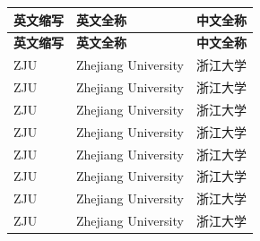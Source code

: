 \cleardoublepage
{}

\begin{center}
    \begin{longtable}{m{2cm}m{8cm}m{5cm}}
        \toprule
        \textbf{英文缩写}&\textbf{英文全称}&\textbf{中文全称}\\
        \midrule
        \endfirsthead
        \toprule
        \textbf{英文缩写}&\textbf{英文全称}&\textbf{中文全称}\\
        \midrule
        \endhead 
        \bottomrule
        \endfoot
        \bottomrule
        \endlastfoot
        ZJU&Zhejiang University&浙江大学\\
        ZJU&Zhejiang University&浙江大学\\
        ZJU&Zhejiang University&浙江大学\\
        ZJU&Zhejiang University&浙江大学\\
        ZJU&Zhejiang University&浙江大学\\
        ZJU&Zhejiang University&浙江大学\\
        ZJU&Zhejiang University&浙江大学\\
        ZJU&Zhejiang University&浙江大学\\
	\end{longtable}
\end{center}
